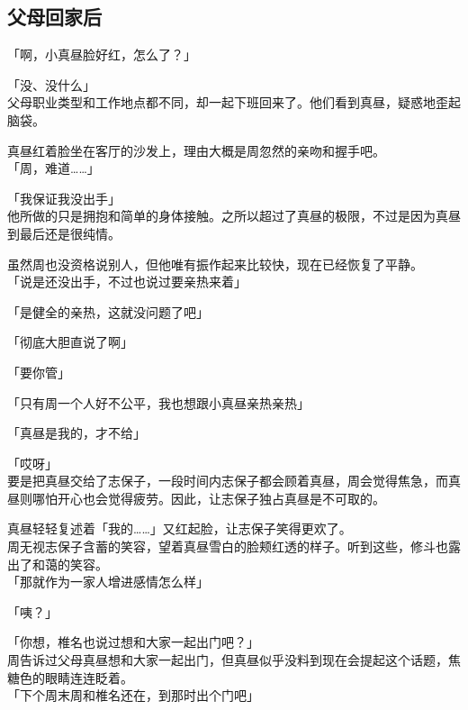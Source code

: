 \subsection{父母回家后}

「啊，小真昼脸好红，怎么了？」

「没、没什么」\\

父母职业类型和工作地点都不同，却一起下班回来了。他们看到真昼，疑惑地歪起脑袋。

真昼红着脸坐在客厅的沙发上，理由大概是周忽然的亲吻和握手吧。\\

「周，难道……」

「我保证我没出手」\\

他所做的只是拥抱和简单的身体接触。之所以超过了真昼的极限，不过是因为真昼到最后还是很纯情。

虽然周也没资格说别人，但他唯有振作起来比较快，现在已经恢复了平静。\\

「说是还没出手，不过也说过要亲热来着」

「是健全的亲热，这就没问题了吧」

「彻底大胆直说了啊」

「要你管」

「只有周一个人好不公平，我也想跟小真昼亲热亲热」

「真昼是我的，才不给」

「哎呀」\\

要是把真昼交给了志保子，一段时间内志保子都会顾着真昼，周会觉得焦急，而真昼则哪怕开心也会觉得疲劳。因此，让志保子独占真昼是不可取的。

真昼轻轻复述着「我的……」又红起脸，让志保子笑得更欢了。\\

周无视志保子含蓄的笑容，望着真昼雪白的脸颊红透的样子。听到这些，修斗也露出了和蔼的笑容。\\

「那就作为一家人增进感情怎么样」

「咦？」

「你想，椎名也说过想和大家一起出门吧？」\\

周告诉过父母真昼想和大家一起出门，但真昼似乎没料到现在会提起这个话题，焦糖色的眼睛连连眨着。\\

「下个周末周和椎名还在，到那时出个门吧」

